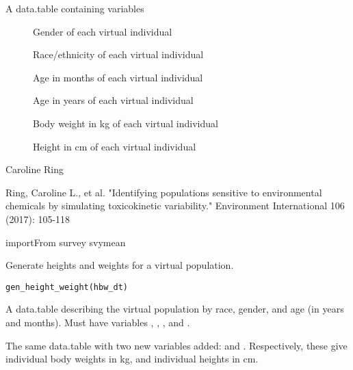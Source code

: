 \documentclass[a4paper]{book}
\begin{document}
%
\begin{Value}
A data.table containing variables \begin{description}
 
\item[] Gender of each virtual individual
\item[] Race/ethnicity of each virtual individual
\item[] Age in months of each virtual individual
\item[] Age in years of each virtual individual
\item[] Body weight in kg of each virtual individual
\item[] Height in cm of each virtual individual
\end{description}

\end{Value}
%
\begin{Author}\relax
Caroline Ring
\end{Author}
%
\begin{References}\relax
Ring, Caroline L., et al. "Identifying populations sensitive to 
environmental chemicals by simulating toxicokinetic variability." Environment 
International 106 (2017): 105-118

importFrom survey svymean
\end{References}
%
\begin{Description}\relax
Generate heights and weights for a virtual population.
\end{Description}
%
\begin{Usage}
\begin{verbatim}
gen_height_weight(hbw_dt)
\end{verbatim}
\end{Usage}
%
\begin{Arguments}
\begin{ldescription}
\item[\code{hbw\_dt}] A data.table describing the virtual population by race,
gender, and age (in years and months). Must have variables ,
, , and .
\end{ldescription}
\end{Arguments}
%
\begin{Value}
The same data.table with two new variables added:  and
. Respectively, these give individual body weights in kg, and
individual heights in cm.
\end{Value}
\end{document}

